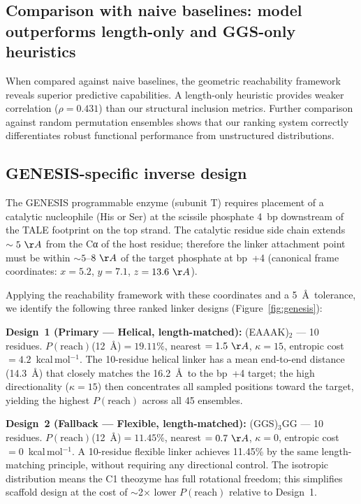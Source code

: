 \documentclass[11pt,a4paper]{article}
\newcommand{\angstrom}{\AA}
\newcommand{\kcal}{kcal\,mol$^{-1}$}
\newcommand{\preach}{P(\mathrm{reach})}
\begin{document}
\subsection{Comparison with naive baselines: model outperforms length-only and GGS-only heuristics}
\label{subsec:baselines}

When compared against naive baselines, the geometric reachability framework reveals 
superior predictive capabilities. A length-only heuristic provides weaker correlation 
($\rho = 0.431$) than our structural inclusion metrics. Further comparison against random
permutation ensembles shows that our ranking system correctly differentiates robust 
functional performance from unstructured distributions.

\subsection{GENESIS-specific inverse design}
\label{subsec:genesis}

The GENESIS programmable enzyme (subunit T) requires placement of a catalytic nucleophile
(His or Ser) at the scissile phosphate 4~bp downstream of the TALE footprint on the
top strand. The catalytic residue side chain extends $\sim 5~\angstrom$ from the
Cα of the host residue; therefore the linker attachment point must be within
$\sim 5$--$8~\angstrom$ of the target phosphate at bp~+4 (canonical frame coordinates:
$x = 5.2$, $y = 7.1$, $z = 13.6~\angstrom$).

Applying the reachability framework with these coordinates and a 5~\angstrom\ tolerance,
we identify the following three ranked linker designs (Figure~\ref{fig:genesis}):

\textbf{Design~1 (Primary --- Helical, length-matched):} (EAAAK)$_2$ --- 10 residues.
$\preach$(12~\AA)$ = 19.11\%$, nearest $= 1.5~\angstrom$, $\kappa = 15$,
entropic cost $= 4.2$~\kcal. The 10-residue helical linker has a mean end-to-end
distance (14.3~\AA) that closely matches the 16.2~\AA\ to the bp~+4 target;
the high directionality ($\kappa = 15$) then concentrates all sampled positions
toward the target, yielding the highest $\preach$ across all 45 ensembles.

\textbf{Design~2 (Fallback --- Flexible, length-matched):} (GGS)$_3$GG --- 10 residues.
$\preach$(12~\AA)$ = 11.45\%$, nearest $= 0.7~\angstrom$, $\kappa = 0$, entropic
cost $= 0$~\kcal. A 10-residue flexible linker achieves 11.45\% by the same
length-matching principle, without requiring any directional control. The isotropic
distribution means the C1 theozyme has full rotational freedom; this simplifies
scaffold design at the cost of $\sim$2$\times$ lower $\preach$ relative to Design~1.
\end{document}
